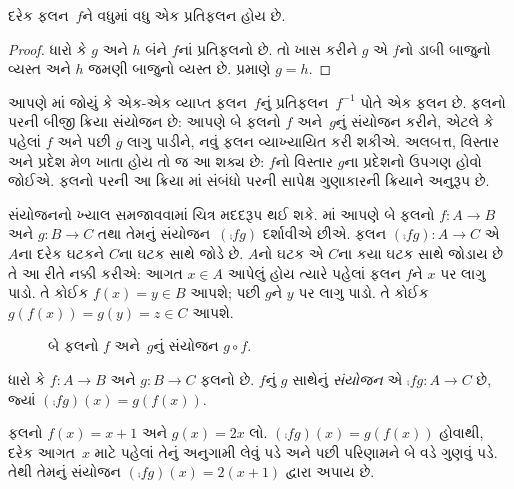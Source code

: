 \begin{prop}
દરેક ફલન~$f$ને વધુમાં વધુ એક પ્રતિફલન હોય છે.
\end{prop}

\begin{proof}
ધારો કે $g$ અને $h$ બંને $f$નાં પ્રતિફલનો છે.
તો ખાસ કરીને $g$ એ $f$નો ડાબી બાજુનો વ્યસ્ત
અને $h$ જમણી બાજુનો વ્યસ્ત છે.
 પ્રમાણે $g = h$.
\end{proof}
\endgroup


\begingroup
\makeatletter{}\makeatother

\label{guunit:OLP-0025}


\begin{explain}
આપણે માં
જોયું કે એક-એક વ્યાપ્ત ફલન~$f$નું પ્રતિફલન~$f^{-1}$
પોતે એક ફલન છે. ફલનો પરની બીજી ક્રિયા સંયોજન છે:
આપણે બે ફલનો $f$ અને~$g$નું સંયોજન કરીને,
એટલે કે પહેલાં $f$ અને પછી $g$ લાગુ પાડીને, નવું ફલન
વ્યાખ્યાયિત કરી શકીએ. અલબત્ત, વિસ્તાર અને પ્રદેશ મેળ ખાતા
હોય તો જ આ શક્ય છે: $f$નો વિસ્તાર $g$ના પ્રદેશનો
ઉપગણ હોવો જોઈએ. ફલનો
પરની આ ક્રિયા માં સંબંધો પરની
સાપેક્ષ ગુણાકારની ક્રિયાને અનુરૂપ છે.

સંયોજનનો ખ્યાલ સમજાવવામાં ચિત્ર મદદરૂપ થઈ શકે.
માં આપણે બે ફલનો
$f \colon A \to B$ અને $g \colon B \to C$
તથા તેમનું સંયોજન~$(\comp{f}{g})$ દર્શાવીએ છીએ.
ફલન $(\comp{f}{g}) \colon A \to C$ એ $A$ના દરેક
ઘટકને $C$ના ઘટક સાથે જોડે છે.
$A$નો ઘટક એ $C$ના કયા ઘટક
સાથે જોડાય છે તે આ રીતે નક્કી કરીએ: આગત $x \in
A$ આપેલું હોય ત્યારે પહેલાં ફલન $f$ને $x$ પર લાગુ પાડો.
તે કોઈક $f(x)
= y \in B$ આપશે; પછી $g$ને $y$ પર લાગુ પાડો.
તે કોઈક $g(f(x)) = g(y) = z \in C$ આપશે.
\begin{figure}
  \caption{બે ફલનો $f$ અને~$g$નું સંયોજન $g \circ f$.}
\end{figure}
\end{explain}

\begin{defn}[સંયોજન]
ધારો કે $f\colon A \to B$ અને $g\colon B \to C$
ફલનો છે. $f$નું $g$ સાથેનું \emph{સંયોજન}
એ $\comp{f}{g} \colon A \to C$ છે, જ્યાં
$(\comp{f}{g})(x) = g(f(x))$.
\end{defn}

\begin{ex}
ફલનો $f(x) = x + 1$ અને $g(x) = 2x$ લો.
$(\comp{f}{g})(x) = g(f(x))$ હોવાથી, દરેક આગત~$x$
માટે પહેલાં તેનું અનુગામી લેવું પડે અને પછી પરિણામને
બે વડે ગુણવું પડે. તેથી તેમનું સંયોજન
$(\comp{f}{g})(x) = 2(x+1)$ દ્વારા અપાય છે.
\end{ex}

